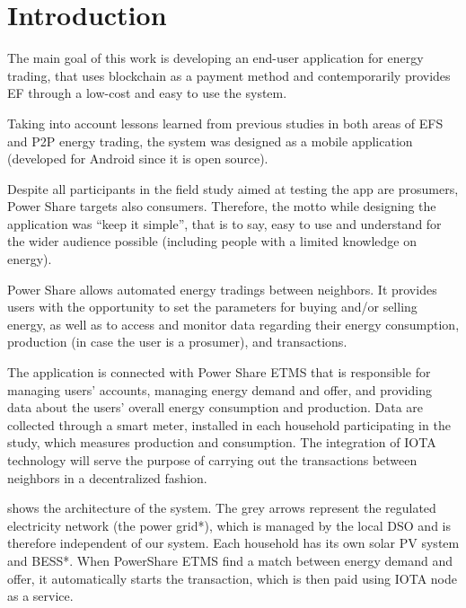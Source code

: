 \cleardoublepage
\label{chap:implement}
\section{Introduction} 

The main goal of this work is developing an end-user application for energy trading, that uses blockchain as a payment method and contemporarily provides \ac{EF} through a low-cost and easy to use the system.


Taking into account lessons learned from previous studies in both areas of \ac{EFS} and \ac{P2P} energy trading, the system was designed as a mobile application (developed for Android since it is open source).



Despite all participants in the field study aimed at testing the app are prosumers, Power Share targets also consumers. Therefore, the motto while designing the application was “keep it simple”, that is to say, easy to use and understand for the wider audience possible (including people with a limited knowledge on energy).



Power Share allows automated energy tradings between neighbors. It provides users with the opportunity to set the parameters for buying and/or selling energy, as well as to access and monitor data regarding their energy consumption, production (in case the user is a prosumer), and transactions.



The application is connected with Power Share \ac{ETMS} that is responsible for managing users’ accounts, managing energy demand and offer, and providing data about the users’ overall energy consumption and production. Data are collected through a smart meter, installed in each household participating in the study, which measures production and consumption. The integration of IOTA technology will serve the purpose of carrying out the transactions between neighbors in a decentralized fashion.


 shows the architecture of the system. The grey arrows represent the regulated electricity network (the power grid*), which is managed by the local \ac{DSO} and is therefore independent of our system. Each household has its own solar PV system and BESS*. When PowerShare \ac{ETMS} find a match between energy demand and offer, it automatically starts the transaction, which is then paid using IOTA node as a service.  


